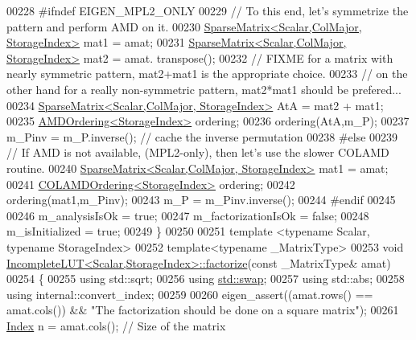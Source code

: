 \begin{DoxyCode}
00228 \textcolor{preprocessor}{#ifndef EIGEN\_MPL2\_ONLY}
00229   \textcolor{comment}{// To this end, let's symmetrize the pattern and perform AMD on it.}
00230   \hyperlink{group___sparse_core___module}{SparseMatrix<Scalar,ColMajor, StorageIndex>} mat1 = amat;
00231   \hyperlink{group___sparse_core___module}{SparseMatrix<Scalar,ColMajor, StorageIndex>} mat2 = amat.
      transpose();
00232   \textcolor{comment}{// FIXME for a matrix with nearly symmetric pattern, mat2+mat1 is the appropriate choice.}
00233   \textcolor{comment}{//       on the other hand for a really non-symmetric pattern, mat2*mat1 should be prefered...}
00234   \hyperlink{group___sparse_core___module}{SparseMatrix<Scalar,ColMajor, StorageIndex>} AtA = mat2 + mat1;
00235   \hyperlink{group___ordering_methods___module_class_eigen_1_1_a_m_d_ordering}{AMDOrdering<StorageIndex>} ordering;
00236   ordering(AtA,m\_P);
00237   m\_Pinv  = m\_P.inverse(); \textcolor{comment}{// cache the inverse permutation}
00238 \textcolor{preprocessor}{#else}
00239   \textcolor{comment}{// If AMD is not available, (MPL2-only), then let's use the slower COLAMD routine.}
00240   \hyperlink{group___sparse_core___module}{SparseMatrix<Scalar,ColMajor, StorageIndex>} mat1 = amat;
00241   \hyperlink{group___ordering_methods___module_class_eigen_1_1_c_o_l_a_m_d_ordering}{COLAMDOrdering<StorageIndex>} ordering;
00242   ordering(mat1,m\_Pinv);
00243   m\_P = m\_Pinv.inverse();
00244 \textcolor{preprocessor}{#endif}
00245 
00246   m\_analysisIsOk = \textcolor{keyword}{true};
00247   m\_factorizationIsOk = \textcolor{keyword}{false};
00248   m\_isInitialized = \textcolor{keyword}{true};
00249 \}
00250 
00251 \textcolor{keyword}{template} <\textcolor{keyword}{typename} Scalar, \textcolor{keyword}{typename} StorageIndex>
00252 \textcolor{keyword}{template}<\textcolor{keyword}{typename} \_MatrixType>
00253 \textcolor{keywordtype}{void} \hyperlink{group___iterative_linear_solvers___module_class_eigen_1_1_incomplete_l_u_t}{IncompleteLUT<Scalar,StorageIndex>::factorize}(\textcolor{keyword}{const} 
      \_MatrixType& amat)
00254 \{
00255   \textcolor{keyword}{using} std::sqrt;
00256   \textcolor{keyword}{using} \hyperlink{endian_8c_a3ca5ecd34b04d6a243c054ac3a57f68d}{std::swap};
00257   \textcolor{keyword}{using} std::abs;
00258   \textcolor{keyword}{using} internal::convert\_index;
00259 
00260   eigen\_assert((amat.rows() == amat.cols()) && \textcolor{stringliteral}{"The factorization should be done on a square matrix"});
00261   \hyperlink{namespace_eigen_a62e77e0933482dafde8fe197d9a2cfde}{Index} n = amat.cols();  \textcolor{comment}{// Size of the matrix}

\end{DoxyCode}

